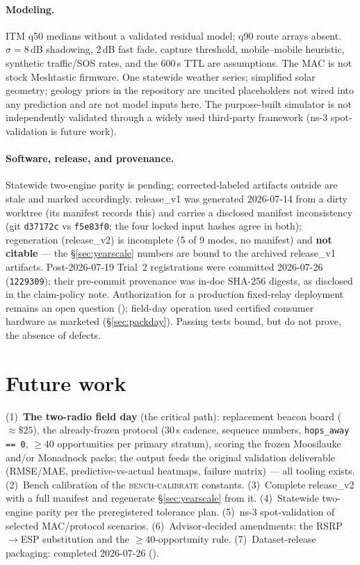 \documentclass[11pt]{article}
\newcommand{\code}[1]{\texttt{\small #1}}
\begin{document}
\paragraph{Modeling.} ITM q50 medians without a validated residual model; q90
route arrays absent. $\sigma = 8$\,dB shadowing, 2\,dB fast fade, capture
threshold, mobile--mobile heuristic, synthetic traffic/SOS rates, and the
600\,s TTL are assumptions. The MAC is not stock Meshtastic firmware. One
statewide weather series; simplified solar geometry; geology priors in the
repository are uncited placeholders not wired into any prediction and are not
model inputs here. The purpose-built simulator is not independently validated
through a widely used third-party framework (ns-3 spot-validation is future
work).

\paragraph{Software, release, and provenance.} Statewide two-engine parity is
pending; corrected-labeled artifacts outside  are stale and
marked accordingly. release\_v1 was generated 2026-07-14 from a dirty
worktree (its manifest records this) and carries a disclosed manifest
inconsistency (git \code{d37172c} vs \code{f5e83f0}; the four locked input
hashes agree in both); regeneration (release\_v2) is incomplete (5 of 9
modes, no manifest) and \textbf{not citable} --- the \S\ref{sec:yearscale}
numbers are bound to the archived release\_v1 artifacts. Post-2026-07-19 Trial~2 registrations were committed 2026-07-26 (\code{1229309}); their pre-commit provenance was in-doc SHA-256 digests, as disclosed in the claim-policy note. Authorization for a production fixed-relay deployment
remains an open question ();
field-day operation used certified consumer hardware as marketed
(\S\ref{sec:packday}). Passing tests bound, but do not prove, the absence of
defects.

\section{Future work}\label{sec:future}

(1)~\textbf{The two-radio field day} (the critical path): replacement beacon
board (${\approx}\$25$), the already-frozen protocol (30\,s cadence, sequence
numbers, \code{hops\_away == 0}, ${\geq}40$ opportunities per primary
stratum), scoring the frozen Moosilauke and/or Monadnock packs; the output
feeds the original validation deliverable (RMSE/MAE, predictive-vs-actual
heatmaps, failure matrix) --- all tooling exists. (2)~Bench calibration of
the \textsc{bench-calibrate} constants. (3)~Complete release\_v2 with a full
manifest and regenerate \S\ref{sec:yearscale} from it. (4)~Statewide
two-engine parity per the preregistered tolerance plan. (5)~ns-3
spot-validation of selected MAC/protocol scenarios. (6)~Advisor-decided
amendments: the RSRP$\to$ESP substitution and the ${\geq}40$-opportunity
rule. (7)~Dataset-release packaging: completed 2026-07-26 ().
\end{document}
